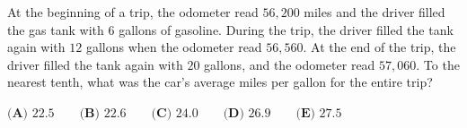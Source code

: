 At the beginning of a trip, the odometer read $56{,}200$ miles and the driver filled the gas tank with $6$ gallons of gasoline. During the trip, the driver filled the tank again with $12$ gallons when the odometer read $56{,}560$. At the end of the trip, the driver filled the tank again with $20$ gallons, and the odometer read $57{,}060$. To the nearest tenth, what was the car's average miles per gallon for the entire trip?

$\textbf{(A) } 22.5\qquad\textbf{(B) } 22.6\qquad\textbf{(C) } 24.0\qquad\textbf{(D) } 26.9\qquad\textbf{(E) } 27.5$
